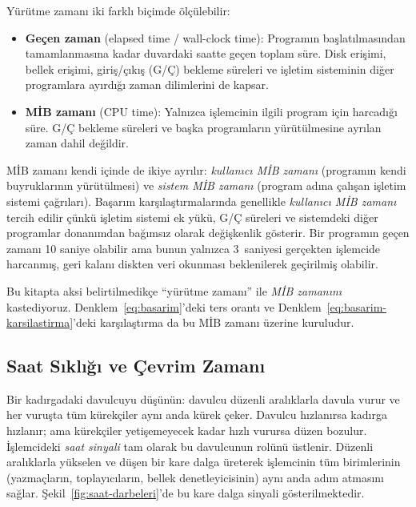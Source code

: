 Yürütme zamanı iki farklı biçimde ölçülebilir:

\begin{itemize}
    \item \textbf{Geçen zaman} (elapsed time / wall-clock time): Programın başlatılmasından tamamlanmasına kadar duvardaki saatte geçen toplam süre. Disk erişimi, bellek erişimi, giriş/çıkış (G/Ç) bekleme süreleri ve işletim sisteminin diğer programlara ayırdığı zaman dilimlerini de kapsar.
    \item \textbf{MİB zamanı} (CPU time): Yalnızca işlemcinin ilgili program için harcadığı süre. G/Ç bekleme süreleri ve başka programların yürütülmesine ayrılan zaman dahil değildir.
\end{itemize}

MİB zamanı kendi içinde de ikiye ayrılır: \emph{kullanıcı MİB zamanı} (programın kendi buyruklarının yürütülmesi) ve \emph{sistem MİB zamanı} (program adına çalışan işletim sistemi çağrıları). Başarım karşılaştırmalarında genellikle \emph{kullanıcı MİB zamanı} tercih edilir çünkü işletim sistemi ek yükü, G/Ç süreleri ve sistemdeki diğer programlar donanımdan bağımsız olarak değişkenlik gösterir. Bir programın geçen zamanı 10 saniye olabilir ama bunun yalnızca 3~saniyesi gerçekten işlemcide harcanmış, geri kalanı diskten veri okunması beklenilerek geçirilmiş olabilir.

\noindent Bu kitapta aksi belirtilmedikçe ``yürütme zamanı'' ile \emph{MİB zamanını} kastediyoruz. Denklem~\ref{eq:basarim}'deki ters orantı ve Denklem~\ref{eq:basarim-karsilastirma}'deki karşılaştırma da bu MİB zamanı üzerine kuruludur.

\subsection{Saat Sıklığı ve Çevrim Zamanı}
\label{subsec:saat-sikligi}

Bir kadırgadaki davulcuyu düşünün: davulcu düzenli aralıklarla davula vurur ve her vuruşta tüm kürekçiler aynı anda kürek çeker. Davulcu hızlanırsa kadırga hızlanır; ama kürekçiler yetişemeyecek kadar hızlı vurursa düzen bozulur. İşlemcideki \emph{saat sinyali} tam olarak bu davulcunun rolünü üstlenir. Düzenli aralıklarla yükselen ve düşen bir kare dalga üreterek işlemcinin tüm birimlerinin (yazmaçların, toplayıcıların, bellek denetleyicisinin) aynı anda adım atmasını sağlar. Şekil~\ref{fig:saat-darbeleri}'de bu kare dalga sinyali gösterilmektedir.

